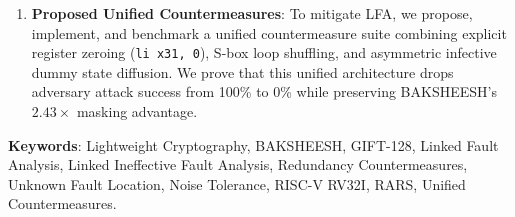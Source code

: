 \begin{enumerate}
    \item \textbf{Proposed Unified Countermeasures}: To mitigate LFA, we propose, implement, and benchmark a unified countermeasure suite combining explicit register zeroing (\texttt{li x31, 0}), S-box loop shuffling, and asymmetric infective dummy state diffusion. We prove that this unified architecture drops adversary attack success from 100\% to 0\% while preserving BAKSHEESH's $2.43\times$ masking advantage.
\end{enumerate}

\noindent
\textbf{Keywords}: Lightweight Cryptography, BAKSHEESH, GIFT-128, Linked Fault Analysis, Linked Ineffective Fault Analysis, Redundancy Countermeasures, Unknown Fault Location, Noise Tolerance, RISC-V RV32I, RARS, Unified Countermeasures.

\cleardoublepage
